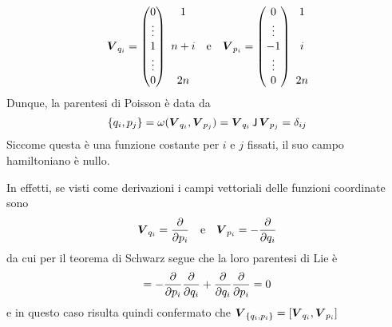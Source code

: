 \begin{equation*}
  \vec{V}_{q_i} = \pmqty{0 \\ \vdots \\ 1 \\ \vdots \\ 0}\ \mqty{1 \\ \phantom{\vdots} \\ n+i \\ \phantom{\vdots} \\ 2n} \qqtext{e} 
  \vec{V}_{p_i} = \pmqty{0 \\ \vdots \\ -1 \\ \vdots \\ 0}\ \mqty{1 \\ \phantom{\vdots} \\ i \\ \phantom{\vdots} \\ 2n}
\end{equation*} 
Dunque, la parentesi di Poisson è data da
\begin{equation*}
\pb{q_i}{p_j} = \omega(\vec{V}_{q_i}, \vec{V}_{p_j}) = \vec{V}_{q_i}\, \mathsf{J}\, \vec{V}_{p_j} = \delta_{ij}
\end{equation*}
Siccome questa è una funzione costante per $i$ e $j$ fissati, il suo campo hamiltoniano è nullo.

In effetti, se visti come derivazioni i campi vettoriali delle funzioni coordinate sono 
\begin{equation*}
\vec{V}_{q_i} = \pdv{p_i} \qqtext{e} \vec{V}_{p_i} = -\pdv{q_i}
\end{equation*}
da cui per il teorema di Schwarz segue che la loro parentesi di Lie è 
\begin{equation*}
[V_{q_i}, V_{p_i}] = -\pdv{p_i}\pdv{q_i} + \pdv{q_i}\pdv{p_i} = 0
\end{equation*}
e in questo caso risulta quindi confermato che $\vec{V}_{\pb{q_i}{p_i}} = [\vec{V}_{q_i}, \vec{V}_{p_i}]$

